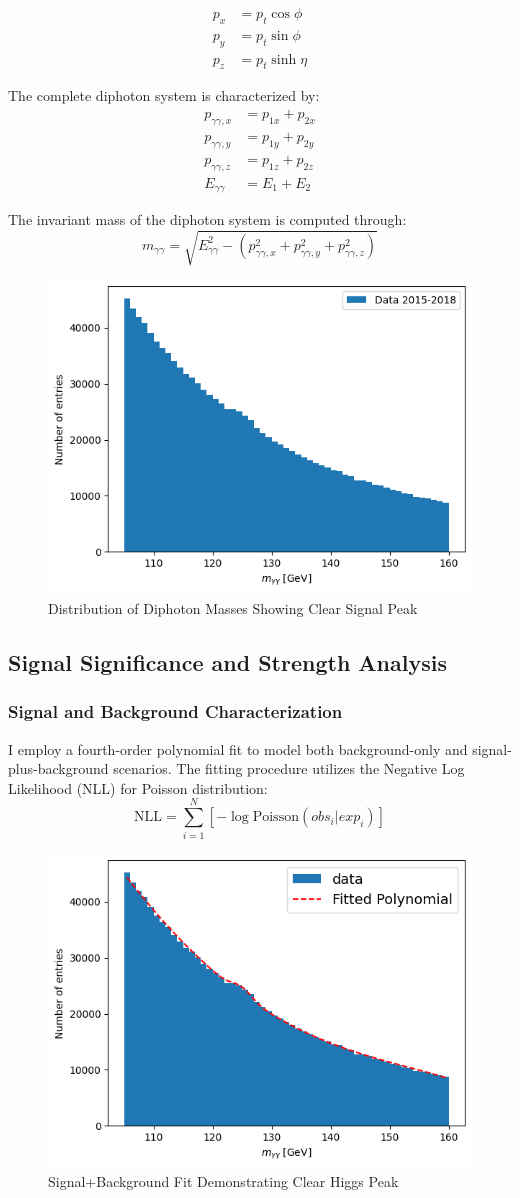 \documentclass{article}
\begin{document}
\begin{align}
    p_x &= p_t\cos{\phi} \\
    p_y &= p_t\sin{\phi} \\
    p_z &= p_t\sinh{\eta}
\end{align}

The complete diphoton system is characterized by:
\begin{align}
    p_{\gamma\gamma,x} &= p_{1x} + p_{2x} \\
    p_{\gamma\gamma,y} &= p_{1y} + p_{2y} \\
    p_{\gamma\gamma,z} &= p_{1z} + p_{2z} \\
    E_{\gamma\gamma} &= E_{1} + E_{2}
\end{align}

The invariant mass of the diphoton system is computed through:
\[
    m_{\gamma\gamma} = \sqrt{E^2_{\gamma\gamma}-(p^2_{\gamma\gamma,x}+p^2_{\gamma\gamma,y}+p^2_{\gamma\gamma,z})}
\]

\begin{figure}
\centering
\includegraphics[width=0.5\linewidth]{1.png}
\caption{Distribution of Diphoton Masses Showing Clear Signal Peak}
\end{figure}

\subsection{Signal Significance and Strength Analysis}
\subsubsection{Signal and Background Characterization}
I employ a fourth-order polynomial fit to model both background-only and signal-plus-background scenarios. The fitting procedure utilizes the Negative Log Likelihood (NLL) for Poisson distribution:
\[
    \text{NLL} = \sum_{i=1}^{N}[-\log \text{Poisson}(obs_i|exp_i)]
\]

\begin{figure}[h]
\centering
\includegraphics[width=0.5\linewidth]{3.png}
\caption{Signal+Background Fit Demonstrating Clear Higgs Peak}
\end{figure}
\end{document}

